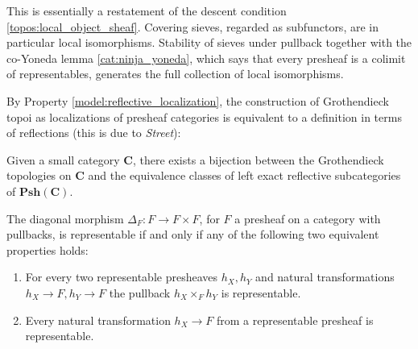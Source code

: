     \begin{remark}
        This is essentially a restatement of the descent condition \ref{topos:local_object_sheaf}. Covering sieves, regarded as subfunctors, are in particular local isomorphisms. Stability of sieves under pullback together with the co-Yoneda lemma \ref{cat:ninja_yoneda}, which says that every presheaf is a colimit of representables, generates the full collection of local isomorphisms.
    \end{remark}
    By Property \ref{model:reflective_localization}, the construction of Grothendieck topoi as localizations of presheaf categories is equivalent to a definition in terms of reflections (this is due to \textit{Street}):
    \begin{result}
        Given a small category $\mathbf{C}$, there exists a bijection between the Grothendieck topologies on $\mathbf{C}$ and the equivalence classes of left exact reflective subcategories of $\mathbf{Psh(C)}$.
    \end{result}

    \begin{property}[Diagonals]\label{topos:representable_diagonal}
        The diagonal morphism $\Delta_F:F\rightarrow F\times F$, for $F$ a presheaf on a category with pullbacks, is representable if and only if any of the following two equivalent properties holds:
        \begin{enumerate}
            \item For every two representable presheaves $h_X,h_Y$ and natural transformations $h_X\rightarrow F,h_Y\rightarrow F$ the pullback $h_X\times_Fh_Y$ is representable.
            \item Every natural transformation $h_X\rightarrow F$ from a representable presheaf is representable.
        \end{enumerate}
    \end{property}

